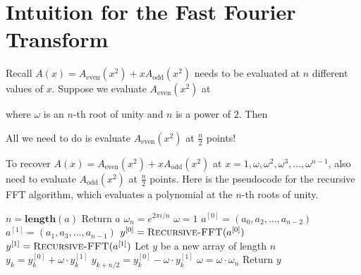 \documentclass[11  pt]{article}
\begin{document}
\section{Intuition for the Fast Fourier Transform}

Recall $A(x) = A_{\mathrm{even}}(x^2) + xA_{\mathrm{odd}}(x^2)$ needs to be evaluated at $n$ different values of $x$. 
Suppose we evaluate $A_{\mathrm{even}}(x^2)$ at 

\vs{1in}

where $\omega$ is an $n$-th root of unity and $n$ is a power of $2$. 
Then 

\vs{2in}

All we need to do is evaluate $A_{\mathrm{even}}(x^2)$ at $\frac{n}{2}$ points!

\vs{0.3in}

To recover $A(x) = A_{\mathrm{even}}(x^2) + xA_{\mathrm{odd}}(x^2)$ at $x=1,\omega,\omega^2,\omega^3,\ldots,\omega^{n-1}$, also need to evaluate $A_{\mathrm{odd}}(x^2)$ at $\frac{n}{2}$ points. 
Here is the pseudocode for the recursive FFT algorithm, which evaluates a polynomial at the $n$-th roots of unity.

\begin{algorithm}
    \caption{Recursive-FFT($a$)}
    \begin{algorithmic}
        \State $n = \textbf{length}(a)$
        \State Return $a$
        \EndIf
        \State $\omega_n = e^{2\pi i / n}$
        \State $\omega = 1$
        \State $a^{[0]} = (a_0, a_2, \hdots, a_{n-2})$
        \State $a^{[1]} = (a_1, a_3, \hdots, a_{n-1})$
        \State $y^{[0]} = \textsc{Recursive-FFT}(a^{[0]})$
        \State $y^{[1]} = \textsc{Recursive-FFT}(a^{[1]})$
        \State Let $y$ be a new array of length $n$
            \State $y_k = y^{[0]}_k + \omega \cdot y^{[1]}_k$
            \State $y_{k + n/2} = y^{[0]}_k - \omega \cdot y^{[1]}_k$
            \State $\omega = \omega \cdot \omega_n$
        \EndFor
        \State Return $y$
    \end{algorithmic}
\end{algorithm}


\newpage
\end{document}
